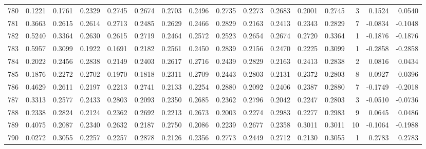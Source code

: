 \begin{tabular}{lrrrrrrrrrrrrrrr}
780 &      0.1221 &  0.1761 &  0.2329 &  0.2745 &  0.2674 &  0.2703 &  0.2496 &  0.2735 &  0.2273 &  0.2683 &   0.2001 &     0.2745 &      3 &                    0.1524 &                     0.0540 \\
781 &      0.3663 &  0.2615 &  0.2614 &  0.2713 &  0.2485 &  0.2629 &  0.2466 &  0.2829 &  0.2163 &  0.2413 &   0.2343 &     0.2829 &      7 &                   -0.0834 &                    -0.1048 \\
782 &      0.5240 &  0.3364 &  0.2630 &  0.2615 &  0.2719 &  0.2464 &  0.2572 &  0.2523 &  0.2654 &  0.2674 &   0.2720 &     0.3364 &      1 &                   -0.1876 &                    -0.1876 \\
783 &      0.5957 &  0.3099 &  0.1922 &  0.1691 &  0.2182 &  0.2561 &  0.2450 &  0.2839 &  0.2156 &  0.2470 &   0.2225 &     0.3099 &      1 &                   -0.2858 &                    -0.2858 \\
784 &      0.2022 &  0.2456 &  0.2838 &  0.2149 &  0.2403 &  0.2617 &  0.2716 &  0.2439 &  0.2829 &  0.2163 &   0.2413 &     0.2838 &      2 &                    0.0816 &                     0.0434 \\
785 &      0.1876 &  0.2272 &  0.2702 &  0.1970 &  0.1818 &  0.2311 &  0.2709 &  0.2443 &  0.2803 &  0.2131 &   0.2372 &     0.2803 &      8 &                    0.0927 &                     0.0396 \\
786 &      0.4629 &  0.2611 &  0.2197 &  0.2213 &  0.2741 &  0.2133 &  0.2254 &  0.2880 &  0.2092 &  0.2406 &   0.2387 &     0.2880 &      7 &                   -0.1749 &                    -0.2018 \\
787 &      0.3313 &  0.2577 &  0.2433 &  0.2803 &  0.2093 &  0.2350 &  0.2685 &  0.2362 &  0.2796 &  0.2042 &   0.2247 &     0.2803 &      3 &                   -0.0510 &                    -0.0736 \\
788 &      0.2338 &  0.2824 &  0.2124 &  0.2362 &  0.2692 &  0.2213 &  0.2673 &  0.2003 &  0.2274 &  0.2983 &   0.2277 &     0.2983 &      9 &                    0.0645 &                     0.0486 \\
789 &      0.4075 &  0.2087 &  0.2340 &  0.2632 &  0.2187 &  0.2750 &  0.2086 &  0.2239 &  0.2677 &  0.2358 &   0.3011 &     0.3011 &     10 &                   -0.1064 &                    -0.1988 \\
790 &      0.0272 &  0.3055 &  0.2257 &  0.2257 &  0.2878 &  0.2126 &  0.2356 &  0.2773 &  0.2449 &  0.2712 &   0.2130 &     0.3055 &      1 &                    0.2783 &                     0.2783 \\

\end{tabular}
